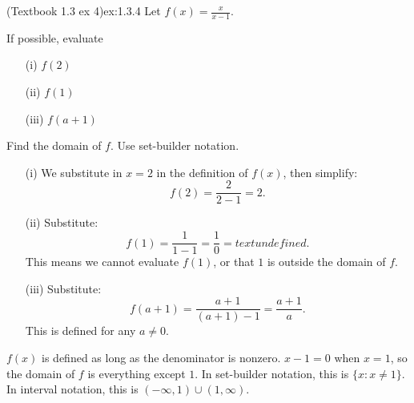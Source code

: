 \documentclass{article}
\begin{document}
\begin{example}{(Textbook 1.3 ex 4)}{ex:1.3.4}
    Let $f(x)=\frac{x}{x-1}$.
    \begin{problem}
        \item If possible, evaluate
            \begin{enumerate}
                \item[(i)] $f(2)$
                \item[(ii)] $f(1)$
                \item[(iii)] $f(a+1)$
            \end{enumerate}
        \item Find the domain of $f$. Use set-builder notation.
    \end{problem}
\end{example}
\begin{solution}
    \begin{problem}
        \item \begin{enumerate}
            \item[(i)] We substitute in $x=2$ in the definition of $f(x)$, then simplify: \[f(2)=\frac{2}{2-1}=2.\]
            \item[(ii)] Substitute: \[f(1)=\frac{1}{1-1}=\frac{1}{0}=text{undefined}.\] This means we cannot evaluate $f(1)$, or that $1$ is outside the domain of $f$.
            \item[(iii)] Substitute: \[f(a+1)=\frac{a+1}{(a+1)-1}=\frac{a+1}{a}.\] This is defined for any $a\neq 0$.
        \end{enumerate}
        \item $f(x)$ is defined as long as the denominator is nonzero. $x-1=0$ when $x=1$, so the domain of $f$ is everything except $1$. In set-builder notation, this is $\{x:x\neq 1\}$. In interval notation, this is $(-\infty,1)\cup(1,\infty)$.
    \end{problem}
\end{solution}
\end{document}
